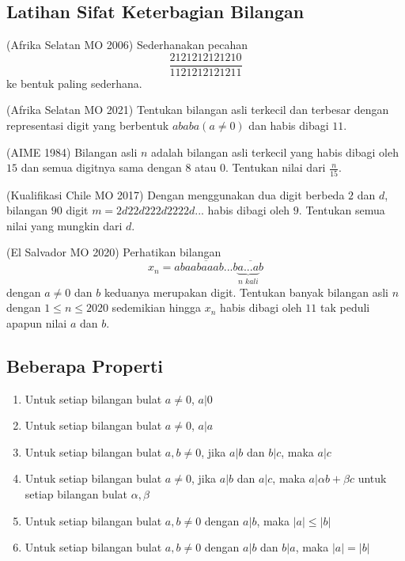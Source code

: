 \documentclass[11pt]{scrartcl}
\begin{document}
\subsection{Latihan Sifat Keterbagian Bilangan}
\begin{problem}
    (Afrika Selatan MO 2006) Sederhanakan pecahan $$\frac{2121212121210}{1121212121211}$$ ke bentuk paling sederhana.
\end{problem}

\begin{problem}
    (Afrika Selatan MO 2021) Tentukan bilangan asli terkecil dan terbesar dengan representasi digit yang berbentuk $ababa (a \neq 0)$ dan habis dibagi $11$.
\end{problem}

\begin{problem}
    (AIME 1984) Bilangan asli $n$ adalah bilangan asli terkecil yang habis dibagi oleh $15$ dan semua digitnya sama dengan $8$ atau $0$. Tentukan nilai dari $\frac{n}{15}$.
\end{problem}

\begin{problem}
    (Kualifikasi Chile MO 2017)
    Dengan menggunakan dua digit berbeda $2$ dan $d$, bilangan $90$ digit $m = 2d22d222d2222d...$ habis dibagi oleh $9$. Tentukan semua nilai yang mungkin dari $d$.
\end{problem}

\begin{problem}
    (El Salvador MO 2020) Perhatikan bilangan $$x_n =\overline{abaabaaab...b}\overline{\underbrace{a...a}_{n\,\, kali}{b}}$$ dengan $a\neq 0$ dan $b$ keduanya merupakan digit. Tentukan banyak bilangan asli $n$ dengan $1 \leq n \leq 2020$ sedemikian hingga $x_n$ habis dibagi oleh $11$ tak peduli apapun nilai $a$ dan $b$.
\end{problem}

\subsection{Beberapa Properti}
\begin{enumerate}
\item Untuk setiap bilangan bulat $a \neq 0$, $a|0$
\item Untuk setiap bilangan bulat $a \neq 0$, $a|a$
\item Untuk setiap bilangan bulat $a,b \neq 0$, jika $a|b$ dan $b|c$, maka $a|c$
\item Untuk setiap bilangan bulat $a \neq 0$, jika $a|b$ dan $a|c$, maka $a|\alpha b + \beta c$ untuk setiap bilangan bulat $\alpha, \beta$
\item Untuk setiap bilangan bulat $a,b \neq 0$ dengan $a|b$, maka $|a|\leq |b|$
\item Untuk setiap bilangan bulat $a,b \neq 0$ dengan $a|b$ dan $b|a$, maka $|a| = |b|$
\end{enumerate}
\end{document}

